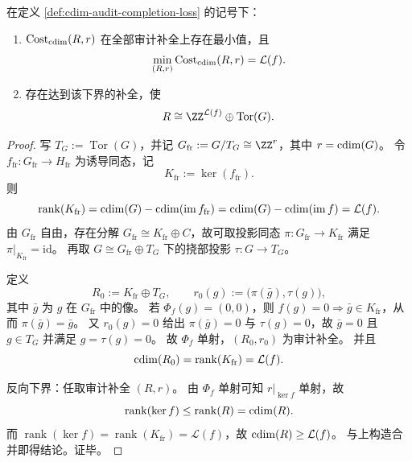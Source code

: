 \begin{theorem}[同态的最小圆维审计补全]\label{thm:cdim-minimal-audit-completion}
在定义 \ref{def:cdim-audit-completion-loss} 的记号下：
\begin{enumerate}
  \item \(\operatorname{Cost}_{\operatorname{cdim}}(R,r)\) 在全部审计补全上存在最小值，且
  \[
  \min_{(R,r)}\operatorname{Cost}_{\operatorname{cdim}}(R,r)=\mathcal L(f).
  \]
  \item 存在达到该下界的补全，使
  \[
  R\cong \ZZ^{\mathcal L(f)}\oplus\operatorname{Tor}(G).
  \]
\end{enumerate}
\end{theorem}
\begin{proof}
写 \(T_G:=\operatorname{Tor}(G)\)，并记 \(G_{\mathrm{fr}}:=G/T_G\cong\ZZ^r\)，其中 \(r=\operatorname{cdim}(G)\)。
令 \(f_{\mathrm{fr}}:G_{\mathrm{fr}}\to H_{\mathrm{fr}}\) 为诱导同态，记
\[
K_{\mathrm{fr}}:=\ker(f_{\mathrm{fr}}).
\]
则
\[
\operatorname{rank}(K_{\mathrm{fr}})
=\operatorname{cdim}(G)-\operatorname{cdim}(\operatorname{im}f_{\mathrm{fr}})
=\operatorname{cdim}(G)-\operatorname{cdim}(\operatorname{im}f)
=\mathcal L(f).
\]
由 \(G_{\mathrm{fr}}\) 自由，存在分解 \(G_{\mathrm{fr}}\cong K_{\mathrm{fr}}\oplus C\)，故可取投影同态
\(
\pi:G_{\mathrm{fr}}\to K_{\mathrm{fr}}
\)
满足 \(\pi|_{K_{\mathrm{fr}}}=\mathrm{id}\)。
再取 \(G\cong G_{\mathrm{fr}}\oplus T_G\) 下的挠部投影 \(\tau:G\to T_G\)。

定义
\[
R_0:=K_{\mathrm{fr}}\oplus T_G,\qquad
r_0(g):=\bigl(\pi(\bar g),\tau(g)\bigr),
\]
其中 \(\bar g\) 为 \(g\) 在 \(G_{\mathrm{fr}}\) 中的像。
若 \(\Phi_f(g)=(0,0)\)，则 \(f(g)=0\Rightarrow \bar g\in K_{\mathrm{fr}}\)，从而
\(
\pi(\bar g)=\bar g
\)。
又 \(r_0(g)=0\) 给出 \(\pi(\bar g)=0\) 与 \(\tau(g)=0\)，故 \(\bar g=0\) 且 \(g\in T_G\) 并满足 \(g=\tau(g)=0\)。
故 \(\Phi_f\) 单射，\((R_0,r_0)\) 为审计补全。
并且
\[
\operatorname{cdim}(R_0)=\operatorname{rank}(K_{\mathrm{fr}})=\mathcal L(f).
\]

反向下界：任取审计补全 \((R,r)\)。
由 \(\Phi_f\) 单射可知 \(r|_{\ker f}\) 单射，故
\[
\operatorname{rank}(\ker f)\le \operatorname{rank}(R)=\operatorname{cdim}(R).
\]
而 \(\operatorname{rank}(\ker f)=\operatorname{rank}(K_{\mathrm{fr}})=\mathcal L(f)\)，故
\(
\operatorname{cdim}(R)\ge \mathcal L(f)
\)。
与上构造合并即得结论。证毕。
\end{proof}

